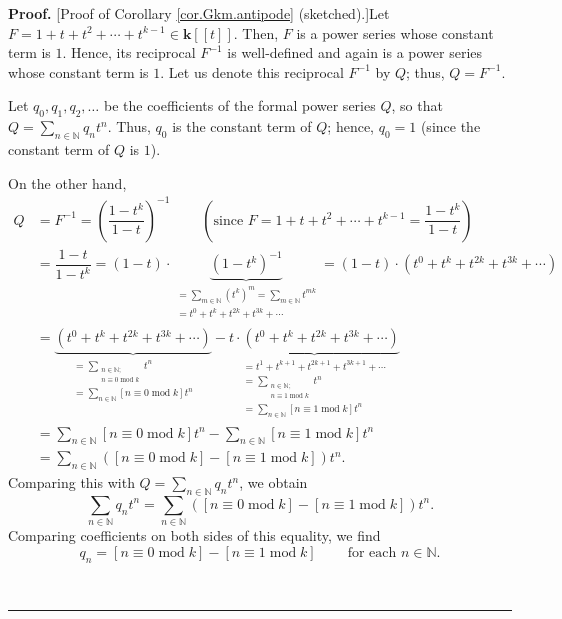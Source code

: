 \documentclass[numbers=enddot,12pt,final,onecolumn,notitlepage]{scrartcl}%
\theoremstyle{definition}
\newenvironment{proof}[1][Proof]{\noindent\textbf{#1.} }{\ \rule{0.5em}{0.5em}}
\let\sumnonlimits\sum
\renewcommand{\sum}{\sumnonlimits\limits}
\begin{document}
\begin{proof}
[Proof of Corollary \ref{cor.Gkm.antipode} (sketched).]Let $F=1+t+t^{2}%
+\cdots+t^{k-1}\in\mathbf{k}\left[  \left[  t\right]  \right]  $. Then, $F$ is
a power series whose constant term is $1$. Hence, its reciprocal $F^{-1}$ is
well-defined and again is a power series whose constant term is $1$. Let us
denote this reciprocal $F^{-1}$ by $Q$; thus, $Q=F^{-1}$.

Let $q_{0},q_{1},q_{2},\ldots$ be the coefficients of the formal power series
$Q$, so that $Q=\sum_{n\in\mathbb{N}}q_{n}t^{n}$. Thus, $q_{0}$ is the
constant term of $Q$; hence, $q_{0}=1$ (since the constant term of $Q$ is $1$).

On the other hand,%
\begin{align*}
Q  &  =F^{-1}=\left(  \dfrac{1-t^{k}}{1-t}\right)  ^{-1}%
\ \ \ \ \ \ \ \ \ \ \left(  \text{since }F=1+t+t^{2}+\cdots+t^{k-1}%
=\dfrac{1-t^{k}}{1-t}\right) \\
&  =\dfrac{1-t}{1-t^{k}}=\left(  1-t\right)  \cdot\underbrace{\left(
1-t^{k}\right)  ^{-1}}_{\substack{=\sum_{m\in\mathbb{N}}\left(  t^{k}\right)
^{m}=\sum_{m\in\mathbb{N}}t^{mk}\\=t^{0}+t^{k}+t^{2k}+t^{3k}+\cdots}}=\left(
1-t\right)  \cdot\left(  t^{0}+t^{k}+t^{2k}+t^{3k}+\cdots\right) \\
&  =\underbrace{\left(  t^{0}+t^{k}+t^{2k}+t^{3k}+\cdots\right)
}_{\substack{=\sum_{\substack{n\in\mathbb{N};\\n\equiv0\operatorname{mod}%
k}}t^{n}\\=\sum_{n\in\mathbb{N}}\left[  n\equiv0\operatorname{mod}k\right]
t^{n}}}-\underbrace{t\cdot\left(  t^{0}+t^{k}+t^{2k}+t^{3k}+\cdots\right)
}_{\substack{=t^{1}+t^{k+1}+t^{2k+1}+t^{3k+1}+\cdots\\=\sum_{\substack{n\in
\mathbb{N};\\n\equiv1\operatorname{mod}k}}t^{n}\\=\sum_{n\in\mathbb{N}}\left[
n\equiv1\operatorname{mod}k\right]  t^{n}}}\\
&  =\sum_{n\in\mathbb{N}}\left[  n\equiv0\operatorname{mod}k\right]
t^{n}-\sum_{n\in\mathbb{N}}\left[  n\equiv1\operatorname{mod}k\right]  t^{n}\\
&  =\sum_{n\in\mathbb{N}}\left(  \left[  n\equiv0\operatorname{mod}k\right]
-\left[  n\equiv1\operatorname{mod}k\right]  \right)  t^{n}.
\end{align*}
Comparing this with $Q=\sum_{n\in\mathbb{N}}q_{n}t^{n}$, we obtain%
\[
\sum_{n\in\mathbb{N}}q_{n}t^{n}=\sum_{n\in\mathbb{N}}\left(  \left[
n\equiv0\operatorname{mod}k\right]  -\left[  n\equiv1\operatorname{mod}%
k\right]  \right)  t^{n}.
\]
Comparing coefficients on both sides of this equality, we find%
\begin{equation}
q_{n}=\left[  n\equiv0\operatorname{mod}k\right]  -\left[  n\equiv
1\operatorname{mod}k\right]  \ \ \ \ \ \ \ \ \ \ \text{for each }%
n\in\mathbb{N}. \label{pf.cor.Gkm.antipode.qn=}%
\end{equation}



\end{proof}
\end{document}
